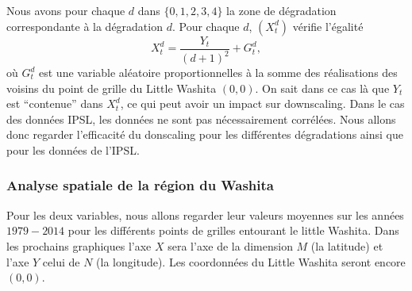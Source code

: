 \documentclass[a4paper,11pt]{article}
\numberwithin{equation}{section}
\begin{document}
Nous avons pour chaque $d$ dans $\{0,1,2,3,4\}$ la zone de dégradation correspondante à la dégradation $d$. Pour chaque $d$, $(X^d_t)$ vérifie l'égalité 
\[X^d_t=\frac{Y_t}{(d+1)^2}+ G^d_t,\]
où $G^d_t$ est une variable aléatoire proportionnelles à la somme des réalisations des voisins du point de grille du Little Washita $(0,0)$. On sait dans ce cas là que $Y_t$ est ``contenue'' dans $X^d_t$, ce qui peut avoir un impact sur downscaling. Dans le cas des données IPSL, les données ne sont pas nécessairement corrélées. Nous allons donc regarder l'efficacité du donscaling pour les différentes dégradations ainsi que pour les données de l'IPSL.

\subsubsection{Analyse spatiale de la région du Washita}
\label{ch:analyse spatiale Washita}

Pour les deux variables, nous allons regarder leur valeurs moyennes sur les années $1979-2014$ pour les différents points de grilles entourant le little Washita. Dans les prochains graphiques l'axe $X$ sera l'axe de la dimension $M$ (la latitude) et l'axe $Y$ celui de $N$ (la longitude). Les coordonnées du Little Washita seront encore $(0,0)$.
\end{document}
